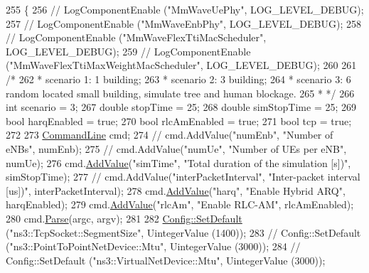 \begin{DoxyCode}
255 \{
256 \textcolor{comment}{//      LogComponentEnable ("MmWaveUePhy", LOG\_LEVEL\_DEBUG);}
257 \textcolor{comment}{//      LogComponentEnable ("MmWaveEnbPhy", LOG\_LEVEL\_DEBUG);}
258 \textcolor{comment}{//      LogComponentEnable ("MmWaveFlexTtiMacScheduler", LOG\_LEVEL\_DEBUG);}
259 \textcolor{comment}{//      LogComponentEnable ("MmWaveFlexTtiMaxWeightMacScheduler", LOG\_LEVEL\_DEBUG);}
260 
261         \textcolor{comment}{/*}
262 \textcolor{comment}{         * scenario 1: 1 building;}
263 \textcolor{comment}{         * scenario 2: 3 building;}
264 \textcolor{comment}{         * scenario 3: 6 random located small building, simulate tree and human blockage.}
265 \textcolor{comment}{         * */}
266         \textcolor{keywordtype}{int} scenario = 3;
267         \textcolor{keywordtype}{double} stopTime = 25;
268         \textcolor{keywordtype}{double} simStopTime = 25;
269         \textcolor{keywordtype}{bool} harqEnabled = \textcolor{keyword}{true};
270         \textcolor{keywordtype}{bool} rlcAmEnabled = \textcolor{keyword}{true};
271         \textcolor{keywordtype}{bool} tcp = \textcolor{keyword}{true};
272 
273         \hyperlink{classns3_1_1CommandLine}{CommandLine} cmd;
274 \textcolor{comment}{//      cmd.AddValue("numEnb", "Number of eNBs", numEnb);}
275 \textcolor{comment}{//      cmd.AddValue("numUe", "Number of UEs per eNB", numUe);}
276         cmd.\hyperlink{classns3_1_1CommandLine_addcfb546c7ad4c8bd0965654d55beb8e}{AddValue}(\textcolor{stringliteral}{"simTime"}, \textcolor{stringliteral}{"Total duration of the simulation [s])"}, simStopTime);
277 \textcolor{comment}{//      cmd.AddValue("interPacketInterval", "Inter-packet interval [us])", interPacketInterval);}
278         cmd.\hyperlink{classns3_1_1CommandLine_addcfb546c7ad4c8bd0965654d55beb8e}{AddValue}(\textcolor{stringliteral}{"harq"}, \textcolor{stringliteral}{"Enable Hybrid ARQ"}, harqEnabled);
279         cmd.\hyperlink{classns3_1_1CommandLine_addcfb546c7ad4c8bd0965654d55beb8e}{AddValue}(\textcolor{stringliteral}{"rlcAm"}, \textcolor{stringliteral}{"Enable RLC-AM"}, rlcAmEnabled);
280         cmd.\hyperlink{classns3_1_1CommandLine_a5c10b85b3207e5ecb48d907966923156}{Parse}(argc, argv);
281 
282         \hyperlink{group__config_ga2e7882df849d8ba4aaad31c934c40c06}{Config::SetDefault} (\textcolor{stringliteral}{"ns3::TcpSocket::SegmentSize"}, UintegerValue (1400));
283 \textcolor{comment}{//      Config::SetDefault ("ns3::PointToPointNetDevice::Mtu", UintegerValue (3000));}
284 \textcolor{comment}{//      Config::SetDefault ("ns3::VirtualNetDevice::Mtu", UintegerValue (3000));}

\end{DoxyCode}
